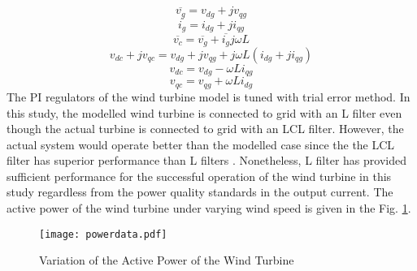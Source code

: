 \begin{equation}
\overline{v_{g}}=v_{dg}+jv_{qg}
\end{equation}
\begin{equation}
\overline{i_{g}}=i_{dg}+ji_{qg}
\end{equation}
\begin{equation}
\overline{v_{c}}=\overline{v_{g}}+\overline{i_{g}}j\omega L
\end{equation}
\begin{equation}
v_{dc}+jv_{qc}=v_{dg}+jv_{qg}+j\omega L (i_{dg}+ji_{qg})
\end{equation}
\begin{equation}
v_{dc}=v_{dg}-\omega L i_{qg}
\label{crosscomp1}
\end{equation}
\begin{equation}
v_{qc}=v_{qg}+\omega L i_{dg}
\label{crosscomp2}
\end{equation}
The PI regulators of the wind turbine model is tuned with trial error method. In this study, the modelled wind turbine is connected to grid with an L filter even though the actual turbine is connected to grid with an LCL filter. However, the actual system would operate better than the modelled case since the the LCL filter has superior performance than L filters \cite{Brantsater2015}. Nonetheless, L filter has provided sufficient performance for the successful operation of the wind turbine in this study regardless from the power quality standards in the output current. The active power of the wind turbine under varying wind speed is given in the Fig. \ref{powerdata}. 
\begin{figure}[h!]
	\centering
	\texttt{[image: powerdata.pdf]}
	\caption{Variation of the Active Power of the Wind Turbine}
	\label{powerdata}
\end{figure}
